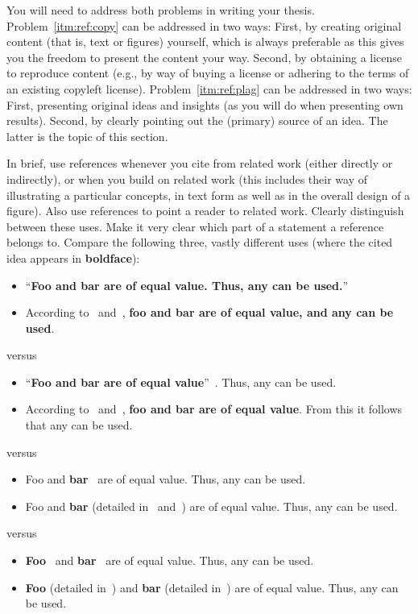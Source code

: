 \documentclass[]{ccs-thesis}
\begin{document}
{You will need to address both problems in writing your thesis.
Problem~\ref{itm:ref:copy} can be addressed in two ways:
First, by creating original content (that is, text or figures) yourself, which is always preferable as this gives you the freedom to present the content your way.
Second, by obtaining a license to reproduce content (e.g., by way of buying a license or adhering to the terms of an existing copyleft license).
Problem~\ref{itm:ref:plag} can be addressed in two ways:
First, presenting original ideas and insights (as you will do when presenting own results).
Second, by clearly pointing out the (primary) source of an idea.
The latter is the topic of this section.

In brief, use references whenever you cite from related work (either directly or indirectly), or when you build on related work (this includes their way of illustrating a particular concepts, in text form as well as in the overall design of a figure).
Also use references to point a reader to related work.
Clearly distinguish between these uses.
Make it very clear which part of a statement a reference belongs to.
Compare the following three, vastly different uses (where the cited idea appears in \textbf{boldface}):

\begin{itemize}
\item ``\textbf{Foo and bar are of equal value. Thus, any can be used.}''~\cite{akyildiz2002survey,arampatzis2005survey}
\item According to~\cite{akyildiz2002survey} and~\cite{arampatzis2005survey}, \textbf{foo and bar are of equal value, and any can be used}.
\end{itemize}
versus
\begin{itemize}
\item ``\textbf{Foo and bar are of equal value}''~\cite{akyildiz2002survey,arampatzis2005survey}. Thus, any can be used.
\item According to~\cite{akyildiz2002survey} and~\cite{arampatzis2005survey}, \textbf{foo and bar are of equal value}. From this it follows that any can be used.
\end{itemize}
versus
\begin{itemize}
\item Foo and \textbf{bar}~\cite{akyildiz2002survey,arampatzis2005survey} are of equal value. Thus, any can be used.
\item Foo and \textbf{bar} (detailed in~\cite{akyildiz2002survey} and~\cite{arampatzis2005survey}) are of equal value. Thus, any can be used.
\end{itemize}
versus
\begin{itemize}
\item \textbf{Foo}~\cite{akyildiz2002survey} and \textbf{bar}~\cite{arampatzis2005survey} are of equal value. Thus, any can be used.
\item \textbf{Foo} (detailed in~\cite{akyildiz2002survey}) and \textbf{bar} (detailed in~\cite{arampatzis2005survey}) are of equal value. Thus, any can be used.
\end{itemize}

}
\end{document}
